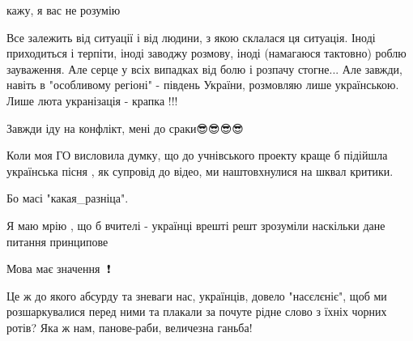 \begin{itemize}
 
кажу, я вас не розумію

 

Все залежить від ситуації і від людини, з якою склалася ця ситуація. Іноді
приходиться і терпіти, іноді заводжу розмову, іноді (намагаюся тактовно) роблю
зауваження. Але серце у всіх випадках від болю і розпачу стогне... Але завжди,
навіть в "особливому регіоні" - південь України, розмовляю лише українською.
Лише люта укранізація - крапка !!!


 
Завжди іду на конфлікт, мені до сраки😎😎😎😎

 

Коли моя ГО висловила думку, що до учнівського проекту краще б підійшла
українська пісня , як супровід до відео, ми наштовхнулися на шквал критики.

Бо масі "какая\_разніца".

Я маю мрію , що б вчителі - українці врешті решт зрозуміли наскільки дане
питання принципове

Мова має значення 📢❗

 

Це ж до якого абсурду та зневаги нас, українців, довело "насєлєніє", щоб ми
розшаркувалися перед ними та плакали за почуте рідне слово з їхніх чорних
ротів? Яка ж нам, панове-раби, величезна ганьба!


\end{itemize}
